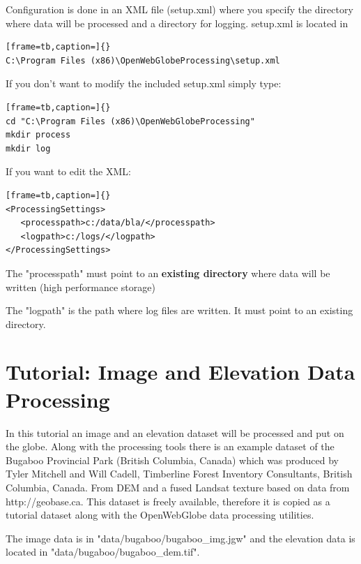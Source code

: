 \documentclass[
	12pt,
	a4paper,
	english,	
	appendixprefix,				     			        
	openany,		     	
	abstracton,		    		    
 	BCOR8mm,		    
]{scrartcl}
\begin{document}
Configuration is done in an XML file (setup.xml) where you specify the directory where data will be processed and a directory for logging. setup.xml is located in 

\begin{lstlisting}[frame=tb,caption=]{}
C:\Program Files (x86)\OpenWebGlobeProcessing\setup.xml
\end{lstlisting}

If you don't want to modify the included setup.xml simply type:

\begin{lstlisting}[frame=tb,caption=]{}
cd "C:\Program Files (x86)\OpenWebGlobeProcessing"
mkdir process
mkdir log
\end{lstlisting}

If you want to edit the XML:

\begin{lstlisting}[frame=tb,caption=]{}
<ProcessingSettings>
   <processpath>c:/data/bla/</processpath>
   <logpath>c:/logs/</logpath>
</ProcessingSettings>
\end{lstlisting}

The "processpath" must point to an \textbf{existing directory} where data will be written (high performance storage)

The "logpath" is the path where log files are written. It must point to an existing directory.


\section{Tutorial: Image and Elevation Data Processing}\label{tutorial}

In this tutorial an image and an elevation dataset will be processed and put on the globe.
Along with the processing tools there is an example dataset of the Bugaboo Provincial Park (British Columbia, Canada) which was produced by Tyler Mitchell and Will Cadell, Timberline Forest Inventory Consultants, British Columbia, Canada.  From DEM and a fused Landsat texture based on data from http://geobase.ca. This dataset is freely available, therefore it is copied as a tutorial dataset along with the OpenWebGlobe data processing utilities.

The image data is in "data/bugaboo/bugaboo\_img.jgw" and the elevation data is located in "data/bugaboo/bugaboo\_dem.tif".
\end{document}
